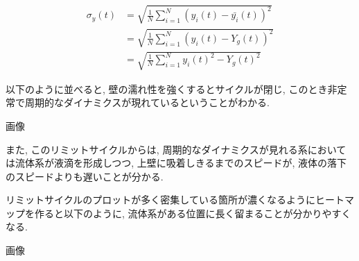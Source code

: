\begin{align}
  \sigma_{y} (t)
  &= \sqrt{\frac{1}{N} \sum_{i=1}^{N} (y_i (t) - \bar{y_i}(t) )^2} \\
  &= \sqrt{\frac{1}{N} \sum_{i=1}^{N} (y_i (t) - Y_g (t) )^2} \\
  &= \sqrt{\frac{1}{N} \sum_{i=1}^{N} {{y_i} (t)}^2 - {{Y_g} (t)}^2}
\end{align}

以下のように並べると, 壁の濡れ性を強くするとサイクルが閉じ, このとき非定常で周期的なダイナミクスが現れているということがわかる.

画像

また, このリミットサイクルからは, 周期的なダイナミクスが見れる系においては流体系が液滴を形成しつつ, 上壁に吸着しきるまでのスピードが, 液体の落下のスピードよりも遅いことが分かる.


% 


% 



リミットサイクルのプロットが多く密集している箇所が濃くなるようにヒートマップを作ると以下のように, 流体系がある位置に長く留まることが分かりやすくなる.

画像

% 



\section{}
